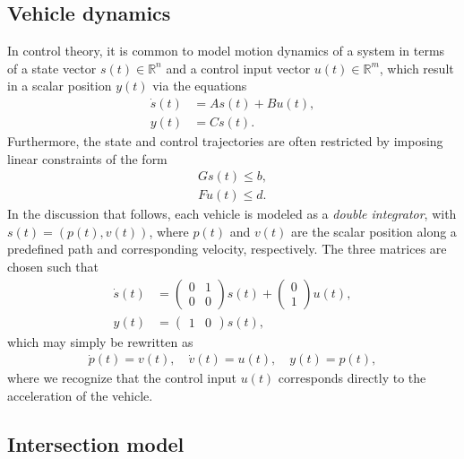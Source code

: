 \documentclass[a4paper]{article}
\author{Jeroen van Riel}
\date{\monthyeardate\today}
\title{}
\theoremstyle{definition}
\theoremstyle{plain}
\begin{document}
\subsection*{Vehicle dynamics}

In control theory, it is common to model motion dynamics of a system in terms of
a state vector $s(t) \in \mathbb{R}^{n}$ and a control input vector
$u(t) \in \mathbb{R}^{m}$, which result in a scalar position $y(t)$ via the
equations
\begin{subequations}\label{eq:control_equations}
\begin{align}
  \dot{s}(t) &= A s(t) + B u(t) , \\
  y(t) &= C s(t) .
\end{align}
\end{subequations}
%
Furthermore, the state and control trajectories are often restricted by imposing
linear constraints of the form
\begin{subequations}\label{eq:control_constraints}
\begin{align}
  G s(t) \leq b , \\
  F u(t) \leq d .
\end{align}
\end{subequations}
%
In the discussion that follows, each vehicle is modeled as a \textit{double integrator},
with $s(t) = (p(t), v(t))$, where $p(t)$ and $v(t)$ are the scalar position
along a predefined path and corresponding velocity, respectively. The three
matrices are chosen such that
\begin{align*}
  \dot{s}(t) &= \begin{pmatrix} 0 & 1 \\ 0 & 0 \end{pmatrix} s(t) + \begin{pmatrix} 0 \\ 1 \end{pmatrix} u(t), \\
  y(t) &= \begin{pmatrix} 1 & 0 \end{pmatrix} s(t),
\end{align*}
which may simply be rewritten as
\begin{align}
  \label{eq:motion_dynamics}
  \dot{p}(t) = v(t) , \quad
  \dot{v}(t) = u(t) , \quad
  y(t) = p(t) ,
\end{align}
where we recognize that the control input $u(t)$ corresponds directly to the
acceleration of the vehicle.


\subsection*{Intersection model}
\end{document}
